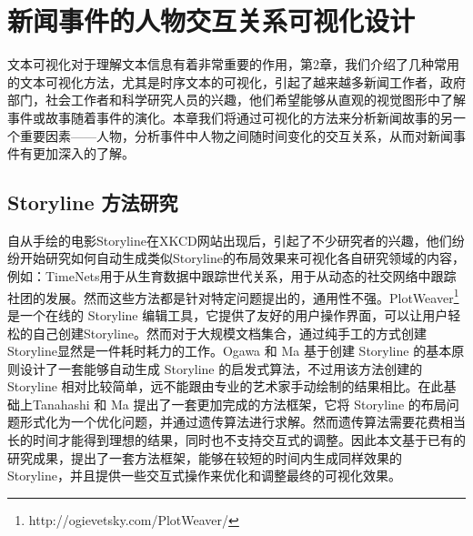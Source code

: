 \chapter{新闻事件的人物交互关系可视化设计}
文本可视化对于理解文本信息有着非常重要的作用，第2章，我们介绍了几种常用的文本可视化方法，尤其是时序文本的可视化，引起了越来越多新闻工作者，政府部门，社会工作者和科学研究人员的兴趣，他们希望能够从直观的视觉图形中了解事件或故事随着事件的演化。本章我们将通过可视化的方法来分析新闻故事的另一个重要因素——人物，分析事件中人物之间随时间变化的交互关系，从而对新闻事件有更加深入的了解。
\section{Storyline 方法研究}
自从手绘的电影Storyline在XKCD网站出现后，引起了不少研究者的兴趣，他们纷纷开始研究如何自动生成类似Storyline的布局效果来可视化各自研究领域的内容，例如：TimeNets\cite{Kim:2010:TGD}用于从生育数据中跟踪世代关系，\cite{Reda2011}用于从动态的社交网络中跟踪社团的发展。然而这些方法都是针对特定问题提出的，通用性不强。PlotWeaver\footnote{http://ogievetsky.com/PlotWeaver/} 是一个在线的 Storyline 编辑工具，它提供了友好的用户操作界面，可以让用户轻松的自己创建Storyline。然而对于大规模文档集合，通过纯手工的方式创建Storyline显然是一件耗时耗力的工作。Ogawa 和 Ma \cite{Ogawa:2010} 基于创建 Storyline 的基本原则设计了一套能够自动生成 Storyline 的启发式算法，不过用该方法创建的 Storyline 相对比较简单，远不能跟由专业的艺术家手动绘制的结果相比。在此基础上Tanahashi 和 Ma\cite{tanahashi2012design} 提出了一套更加完成的方法框架，它将 Storyline 的布局问题形式化为一个优化问题，并通过遗传算法进行求解。然而遗传算法需要花费相当长的时间才能得到理想的结果，同时也不支持交互式的调整。因此本文基于已有的研究成果，提出了一套方法框架，能够在较短的时间内生成同样效果的 Storyline，并且提供一些交互式操作来优化和调整最终的可视化效果。

